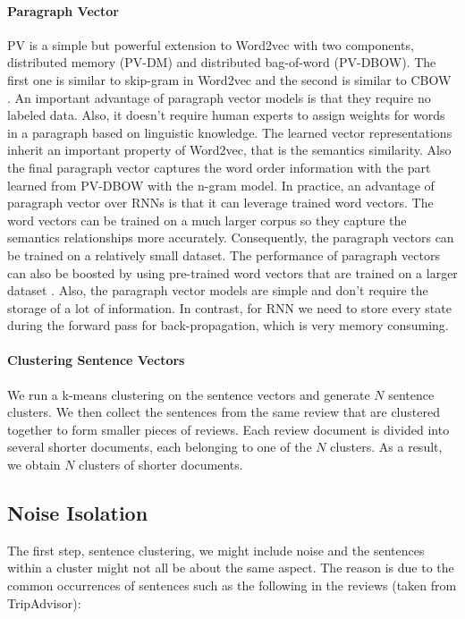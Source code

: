 \paragraph{Paragraph Vector}
PV is a simple but powerful extension to Word2vec \cite{mikolov2013distributed} with two components, 
distributed memory (PV-DM) and distributed bag-of-word (PV-DBOW). 
The first one is similar to skip-gram in Word2vec and 
the second is similar to CBOW \cite{mikolov2013distributed}.
An important advantage of paragraph vector models is that they require 
no labeled data. Also, it doesn't require human experts to assign weights 
for words in a paragraph based on linguistic knowledge. 
The learned vector representations inherit an important property of Word2vec, 
that is the semantics similarity. Also the final paragraph vector captures the 
word order information with the part learned from PV-DBOW with the n-gram model.
In practice, an advantage of paragraph vector over RNNs is that it can 
leverage trained word vectors. The word vectors can be trained on 
a much larger corpus so they capture the semantics relationships more 
accurately.  Consequently, the paragraph vectors can be trained on 
a relatively small dataset. 
The performance of paragraph vectors can also be boosted by using pre-trained 
word vectors that are trained on a larger dataset \cite{mikolov2013linguistic}. 
Also, the paragraph vector models are simple and 
don't require the storage of a lot of information. In contrast, for RNN we 
need to store every state during the forward pass for back-propagation, 
which is very memory consuming.

\paragraph{Clustering Sentence Vectors}
We run a k-means clustering on the sentence vectors and generate 
$N$ sentence clusters. We then collect the sentences from the same review 
that are clustered together to form smaller pieces of reviews. 
Each review document is divided into several shorter documents, each belonging
to one of the $N$ clusters. As a result, we obtain $N$ clusters of shorter documents. 

\subsection{Noise Isolation}
The first step, sentence clustering, we might include noise and the sentences 
within a cluster might not all be about the same aspect. 
The reason is due to the common occurrences of sentences such as the following
in the reviews (taken from TripAdvisor):

